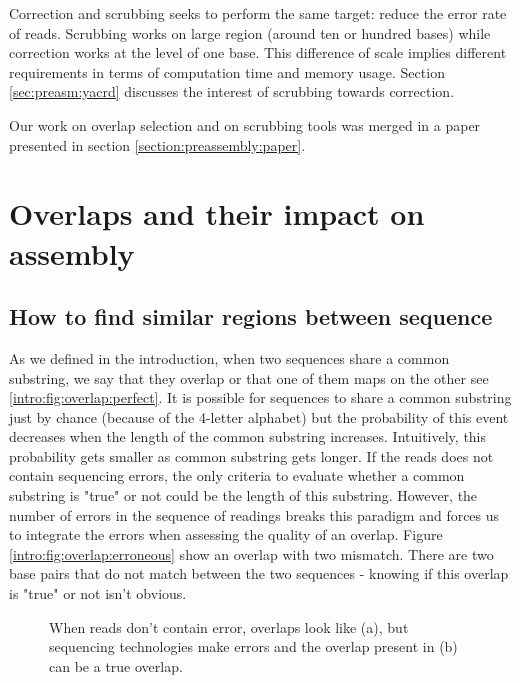 \documentclass[main.tex]{subfiles}
\begin{document}
Correction and scrubbing seeks to perform the same target: reduce the error rate of reads. Scrubbing works on large region (around ten or hundred bases) while correction works at the level of one base. This difference of scale implies different requirements in terms of computation time and memory usage. Section \ref{sec:preasm:yacrd} discusses the interest of scrubbing towards correction.

Our work on overlap selection and on scrubbing tools was merged in a paper presented in section \ref{section:preassembly:paper}.

\section{Overlaps and their impact on assembly}

\subsection{How to find similar regions between sequence} \label{sec:preasm:ovl}

As we defined in the introduction, when two sequences share a common substring, we say that they overlap or that one of them maps on the other see \ref{intro:fig:overlap:perfect}. It is possible for sequences to share a common substring just by chance (because of the 4-letter alphabet) but the probability of this event decreases when the length of the common substring increases. Intuitively, this probability gets smaller as common substring gets longer. If the reads does not contain sequencing errors, the only criteria to evaluate whether a common substring is "true" or not could be the length of this substring. However, the number of errors in the sequence of readings breaks this paradigm and forces us to integrate the errors when assessing the quality of an overlap. Figure \ref{intro:fig:overlap:erroneous} show an overlap with two mismatch. There are two base pairs that do not match between the two sequences - knowing if this overlap is "true" or not isn't obvious.


\begin{figure}[ht]
    \centering
    \caption{When reads don't contain error, overlaps look like (a), but sequencing technologies make errors and the overlap present in (b) can be a true overlap.}
    \label{intro:fig:overlap}
\end{figure}
\end{document}
